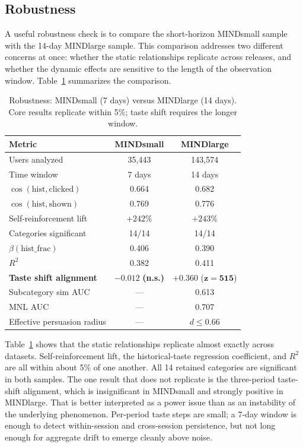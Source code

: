 \documentclass[11pt]{article}
\begin{document}
\subsection{Robustness}

A useful robustness check is to compare the short-horizon MINDsmall sample with the 14-day MINDlarge sample. This comparison addresses two different concerns at once: whether the static relationships replicate across releases, and whether the dynamic effects are sensitive to the length of the observation window. Table~\ref{tab:robustness} summarizes the comparison.

\begin{table}[ht]
\centering
\caption{Robustness: MINDsmall (7 days) versus MINDlarge (14 days). Core results replicate within 5\%; taste shift requires the longer window.}
\label{tab:robustness}
\begin{tabular}{lcc}
\toprule
Metric & MINDsmall & MINDlarge \\
\midrule
Users analyzed & 35,443 & 143,574 \\
Time window & 7 days & 14 days \\
$\cos(\text{hist}, \text{clicked})$ & 0.664 & 0.682 \\
$\cos(\text{hist}, \text{shown})$ & 0.769 & 0.776 \\
Self-reinforcement lift & $+242\%$ & $+243\%$ \\
Categories significant & 14/14 & 14/14 \\
$\beta(\text{hist\_frac})$ & 0.406 & 0.390 \\
$R^2$ & 0.382 & 0.411 \\
\textbf{Taste shift alignment} & $\boldsymbol{-0.012}$ \textbf{(n.s.)} & $\boldsymbol{+0.360}$ ($\boldsymbol{z = 515}$) \\
Subcategory sim AUC & --- & 0.613 \\
MNL AUC & --- & 0.707 \\
Effective persuasion radius & --- & $d \leq 0.66$ \\
\bottomrule
\end{tabular}
\end{table}
\FloatBarrier

Table~\ref{tab:robustness} shows that the static relationships replicate almost exactly across datasets. Self-reinforcement lift, the historical-taste regression coefficient, and $R^2$ are all within about 5\% of one another. All 14 retained categories are significant in both samples. The one result that does not replicate is the three-period taste-shift alignment, which is insignificant in MINDsmall and strongly positive in MINDlarge. That is better interpreted as a power issue than as an instability of the underlying phenomenon. Per-period taste steps are small; a 7-day window is enough to detect within-session and cross-session persistence, but not long enough for aggregate drift to emerge cleanly above noise.
\end{document}
